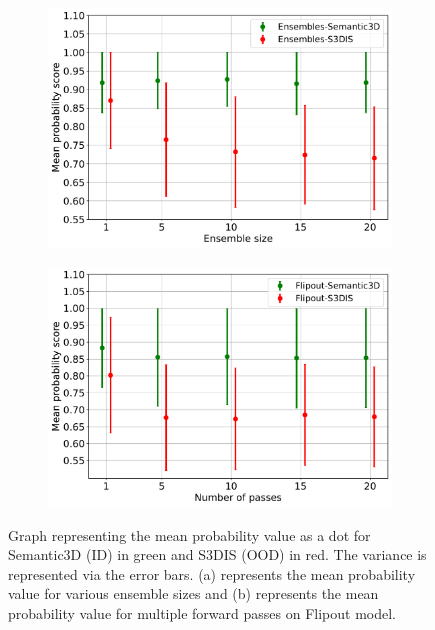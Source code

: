     \begin{figure}[!ht]
        \begin{subfigure}{0.98\textwidth}
            \centering
        \includegraphics[scale=0.5]{images/MSP/Ensembles_MSP_semvs3d.pdf}
        \caption{}
        \label{fig:msp_ensembles}
        \end{subfigure}
        \begin{subfigure}{0.98\textwidth}
            \centering
        \includegraphics[scale=0.5]{images/MSP/Flipout_MSP_semvs3d.pdf}
        \caption{}
        \label{fig:msp_flipout}
        \end{subfigure}
        \caption{Graph representing the mean probability value as a dot for Semantic3D (ID) in green and S3DIS (OOD) in red. The variance is represented via the error bars.  (a) represents the mean probability value for various ensemble sizes and (b) represents the mean probability value for multiple forward passes on Flipout model.}
    \end{figure}

